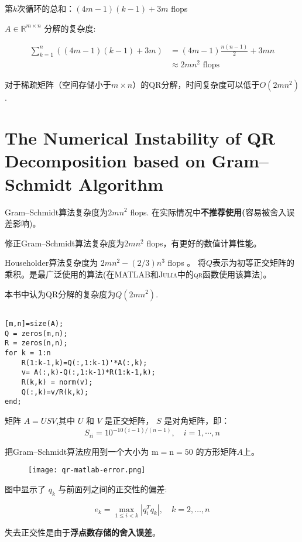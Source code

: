 第$k$次循环的总和：$(4m-1)(k-1)+3m$ flops

$ A \in \mathbb{R}^{m \times n} $ 分解的复杂度:

$$ \begin{aligned} \sum_{k=1}^{n}((4 m-1)(k-1)+3 m) &=(4 m-1) \frac{n(n-1)}{2}+3 m n \\ & \approx 2 m n^{2} \text { flops } \end{aligned} $$

对于稀疏矩阵（空间存储小于$m \times n$）的QR分解，时间复杂度可以低于$O(2mn^2)$. 








\section{The Numerical Instability of QR Decomposition based on Gram–Schmidt Algorithm}

Gram–Schmidt算法复杂度为$2mn^2$ flops. 在实际情况中\textbf{不推荐使用(}容易被舍入误差影响)。

修正Gram–Schmidt算法复杂度为$2mn^2$ flops，有更好的数值计算性能。

Householder算法复杂度为 $ 2 m n^{2}-(2 / 3) n^{3} $ flops 。
将$Q$表示为初等正交矩阵的乘积。是最广泛使用的算法(在\textsc{MATLAB}和\textsc{Julia}中的\textsc{qr}函数使用该算法)。

本书中认为QR分解的复杂度为$Q(2mn^2)$.

\begin{example}
    \begin{verbatim}

[m,n]=size(A);
Q = zeros(m,n);
R = zeros(n,n);
for k = 1:n
    R(1:k-1,k)=Q(:,1:k-1)'*A(:,k);
    v= A(:,k)-Q(:,1:k-1)*R(1:k-1,k);
    R(k,k) = norm(v);
    Q(:,k)=v/R(k,k);
end;
    \end{verbatim}

    矩阵 $ A=U S V $,其中 $ U $ 和 $ V $ 是正交矩阵， $ S $ 是对角矩阵，即：
    $$
    S_{i i}=10^{-10(i-1) /(n-1)}, \quad i=1, \cdots, n
    $$

    把Gram–Schmidt算法应用到一个大小为 $ \mathrm{m}=\mathrm{n}=50 $ 的方形矩阵$A$上。

    \begin{figure}[htbp]
        \centering
        \texttt{[image: qr-matlab-error.png]}
        
    \end{figure}

    图中显示了 $ q_{k} $ 与前面列之间的正交性的偏差:

    $$
    e_{k}=\max _{1 \leq i<k}\left|q_{i}^{T} q_{k}\right|, \quad k=2, \ldots, n
    $$

    失去正交性是由于\textbf{浮点数存储的舍入误差}。
\end{example}

